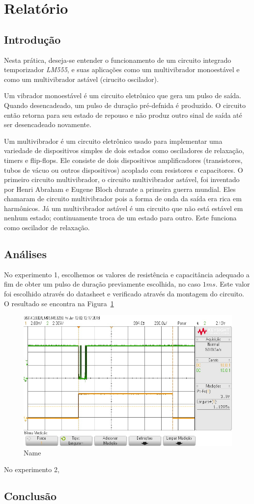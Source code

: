 \documentclass[12pt,a4paper]{article}
\begin{document}
\setcounter{figure}{4}
\setcounter{section}{3}
\setcounter{page}{5}
\section{Relatório}
\subsection{Introdução}

Nesta prática, deseja-se entender o funcionamento de um circuito integrado temporizador \emph{LM555}, e suas aplicações como um multivibrador monoestável e como um multivibrador astável (cirucito oscilador). 

Um vibrador monoestável é um circuito eletrônico que gera um pulso de saída. Quando desencadeado, um pulso de duração pré-defnida é produzido.
O circuito então retorna para seu estado de repouso e não produz outro sinal de saída até ser desencadeado novamente.

Um multivibrador é um circuito eletrônico usado para implementar uma variedade de dispositivos simples de dois estados como osciladores de relaxação, timers e flip-flops.
Ele consiste de dois dispositivos amplificadores (transistores, tubos de vácuo ou outros dispositivos) acoplado com resistores e capacitores.
O primeiro circuito multivibrador, o circuito multivibrador astável, foi inventado por Henri Abraham e Eugene Bloch durante a primeira guerra mundial. 
Eles chamaram de circuito multivibrador pois a forma de onda da saída era rica em harmônicos. 
Já um multivibrador astável é um circuito que não está estável em nenhum estado; continuamente troca de um estado para outro. Este funciona como oscilador de relaxação.




\subsection{Análises}
No experimento 1, escolhemos os valores de resistência e capacitância adequado a fim de obter um pulso de duração previamente escolhida, no caso $1ms$. Este valor foi escolhido através do datasheet e verificado através da montagem do circuito.   O resultado
se encontra na Figura~\ref{fig:1}
\begin{figure}[htpb]
  \centering
  \includegraphics[width=0.8\linewidth]{img/exp1.jpg}
  \caption{Name}
  \label{fig:1}
\end{figure}

No experimento 2, 
\subsection{Conclusão}
\end{document}
